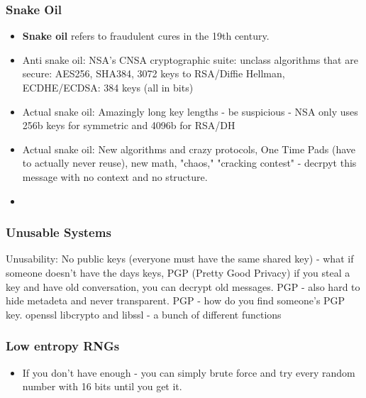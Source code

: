 \documentclass{article}
\begin{document}
\subsubsection{Snake Oil}
\begin{itemize}
\item \textbf{Snake oil} refers to fraudulent cures in the 19th century. 
\item Anti snake oil: NSA's CNSA cryptographic suite: unclass algorithms that are secure: AES256, SHA384, 3072 keys to RSA/Diffie Hellman, ECDHE/ECDSA: 384 keys (all in bits)
\item Actual snake oil: Amazingly long key lengths - be suspicious - NSA only uses 256b keys for symmetric and 4096b for RSA/DH
\item Actual snake oil: New algorithms and crazy protocols, One Time Pads (have to actually never reuse), new math, "chaos," "cracking contest" - decrpyt this message with no context and no structure.
\item 
\end{itemize}
\subsubsection{Unusable Systems}
Unusability: No public keys (everyone must have the same shared key) - what if someone doesn't have the days keys, PGP (Pretty Good Privacy) if you steal a key and have old conversation, you can decrypt old messages. PGP - also hard to hide metadeta and never transparent. PGP - how do you find someone's PGP key. openssl libcrypto and libssl - a bunch of different functions
\subsubsection{Low entropy RNGs}
\begin{itemize}
\item If you don't have enough - you can simply brute force and try every random number with 16 bits until you get it.
\end{itemize}
\end{document}
